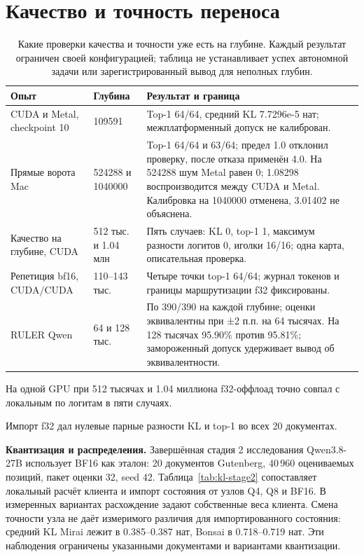 \section{Качество и точность переноса}
\label{sec:quality}

\begin{table}[t]
\centering
\caption{Какие проверки качества и точности уже есть на глубине. Каждый результат ограничен своей конфигурацией;
таблица не устанавливает успех автономной задачи или зарегистрированный вывод для неполных глубин.}
\label{tab:depth-quality-boundaries}
\footnotesize
\begin{tabular}{p{30mm}p{29mm}p{83mm}}
\toprule
Опыт & Глубина & Результат и граница \\
\midrule
CUDA и Metal, checkpoint 10 & 109591 & Top-1 64/64, средний KL 7.7296e-5 нат; межплатформенный допуск не калиброван. \\
Прямые ворота Mac & 524288 и 1040000 & Top-1 64/64 и 63/64; предел 1.0 отклонил проверку, после отказа применён 4.0. На 524288 шум Metal равен 0; 1.08298 воспроизводится между CUDA и Metal. Калибровка на 1040000 отменена, 3.01402 не объяснена. \\
Качество на глубине, CUDA & 512 тыс. и 1.04 млн & Пять случаев: KL 0, top-1 1, максимум разности логитов 0, иголки 16/16; одна карта, описательная проверка. \\
Репетиция bf16, CUDA/CUDA & 110--143 тыс. & Четыре точки top-1 64/64; журнал токенов и границы маршрутизации f32 фиксированы. \\
RULER Qwen & 64 и 128 тыс. & По 390/390 на каждой глубине; оценки эквивалентны при ±2 п.п. на 64 тысячах. На 128 тысячах 95.90\% против 95.81\%; замороженный допуск удерживает вывод об эквивалентности. \\
\bottomrule
\end{tabular}
\end{table}

На одной GPU при 512 тысячах и 1.04 миллиона f32-оффлоад точно совпал с локальным по логитам в пяти случаях.

Импорт f32 дал нулевые парные разности KL и top-1 во всех 20 документах.

\textbf{Квантизация и распределения.} Завершённая стадия 2 исследования Qwen3.8-27B использует
BF16 как эталон: 20 документов Gutenberg, 40\,960 оцениваемых позиций, пакет оценки 32, seed 42.
Таблица~\ref{tab:kl-stage2} сопоставляет локальный расчёт клиента и импорт состояния от узлов Q4, Q8 и BF16.
В измеренных вариантах расхождение задают собственные веса клиента. Смена точности узла
не даёт измеримого различия для импортированного состояния: средний KL Mirai лежит в 0.385--0.387 нат,
Bonsai в 0.718--0.719 нат. Эти наблюдения ограничены указанными документами и вариантами квантизации.

